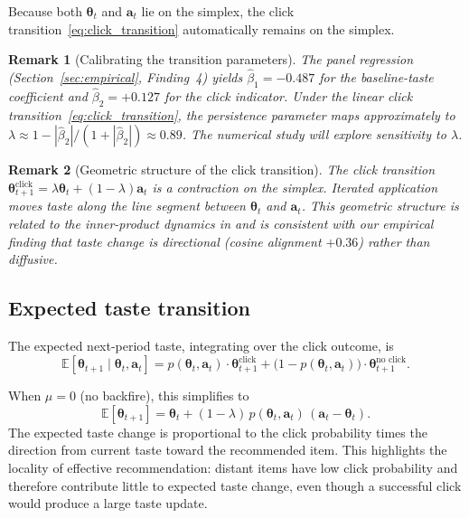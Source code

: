 \documentclass[11pt]{article}
\newtheorem{remark}{Remark}
\newcommand{\E}{\mathbb{E}}
\begin{document}
Because both $\boldsymbol{\theta}_t$ and $\mathbf{a}_t$ lie on the simplex, the click transition~\eqref{eq:click_transition} automatically remains on the simplex.

\begin{remark}[Calibrating the transition parameters]\label{rem:calibration}
The panel regression (Section~\ref{sec:empirical}, Finding~4) yields $\hat{\beta}_1 = -0.487$ for the baseline-taste coefficient and $\hat{\beta}_2 = +0.127$ for the click indicator. Under the linear click transition~\eqref{eq:click_transition}, the persistence parameter maps approximately to $\lambda \approx 1 - |\hat{\beta}_2| / (1 + |\hat{\beta}_2|) \approx 0.89$. The numerical study will explore sensitivity to $\lambda$.
\end{remark}

\begin{remark}[Geometric structure of the click transition]
The click transition $\boldsymbol{\theta}_{t+1}^{\text{click}} = \lambda \boldsymbol{\theta}_t + (1 - \lambda) \mathbf{a}_t$ is a contraction on the simplex. Iterated application moves taste along the line segment between $\boldsymbol{\theta}_t$ and $\mathbf{a}_t$. This geometric structure is related to the inner-product dynamics in \citet{hkazla2019geometric} and is consistent with our empirical finding that taste change is directional (cosine alignment $+0.36$) rather than diffusive.
\end{remark}

\subsection{Expected taste transition}

The expected next-period taste, integrating over the click outcome, is
\begin{equation}\label{eq:expected_transition}
\E[\boldsymbol{\theta}_{t+1} \mid \boldsymbol{\theta}_t, \mathbf{a}_t]
= p(\boldsymbol{\theta}_t, \mathbf{a}_t) \cdot \boldsymbol{\theta}_{t+1}^{\text{click}}
+ \bigl(1 - p(\boldsymbol{\theta}_t, \mathbf{a}_t)\bigr) \cdot \boldsymbol{\theta}_{t+1}^{\text{no click}}.
\end{equation}

When $\mu = 0$ (no backfire), this simplifies to
\begin{equation}\label{eq:expected_simple}
\E[\boldsymbol{\theta}_{t+1}] = \boldsymbol{\theta}_t + (1-\lambda) \, p(\boldsymbol{\theta}_t, \mathbf{a}_t) \, (\mathbf{a}_t - \boldsymbol{\theta}_t).
\end{equation}
The expected taste change is proportional to the click probability times the direction from current taste toward the recommended item. This highlights the locality of effective recommendation: distant items have low click probability and therefore contribute little to expected taste change, even though a successful click would produce a large taste update.
\end{document}
